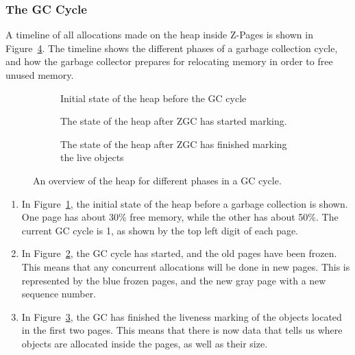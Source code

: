 \subsubsection{The GC Cycle}

A timeline of all allocations made on the heap inside Z-Pages is shown in Figure~\ref{fig:zgc_timeline}. The timeline shows the different phases of a garbage collection cycle, and how the garbage collector prepares for relocating memory in order to free unused memory.

\begin{figure}[H]
    \centering
    \begin{subfigure}[t]{.214\textwidth}
        \centering
        
        \caption{Initial state of the heap before the GC cycle}
        \label{fig:zrel1}
    \end{subfigure}%
    \hfill\vline\hfill
    \begin{subfigure}[t]{.32\textwidth}
        \centering
        
        \caption{The state of the heap after ZGC has started marking.}
        \label{fig:zrel2}
    \end{subfigure}%
    \hfill\vline\hfill
    \begin{subfigure}[t]{.32\textwidth}
        \centering
        
        \caption{The state of the heap after ZGC has finished marking the live objects}
        \label{fig:zrel3}
    \end{subfigure}%
    \caption{An overview of the heap for different phases in a GC cycle.}
    \label{fig:zgc_timeline}
\end{figure}

\begin{enumerate}
    \item In Figure~\ref*{fig:zrel1}, the initial state of the heap before a garbage collection is shown. One page has about 30\% free memory, while the other has about 50\%. The current GC cycle is 1, as shown by the top left digit of each page.
    \item In Figure~\ref*{fig:zrel2}, the GC cycle has started, and the old pages have been frozen. This means that any concurrent allocations will be done in new pages. This is represented by the blue frozen pages, and the new gray page with a new sequence number.
    \item In Figure~\ref*{fig:zrel3}, the GC has finished the liveness marking of the objects located in the first two pages. This means that there is now data that tells us where objects are allocated inside the pages, as well as their size.
\end{enumerate}

